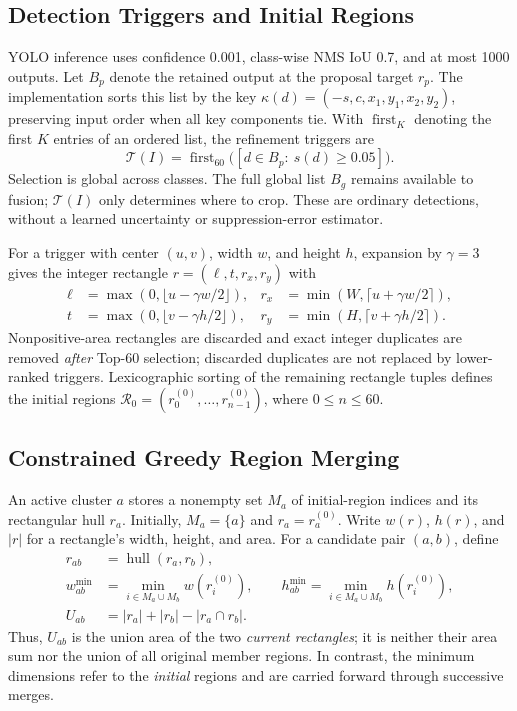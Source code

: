 \documentclass[journal]{IEEEtran}
\begin{document}
\subsection{Detection Triggers and Initial Regions}
YOLO inference uses confidence 0.001, class-wise NMS IoU 0.7, and at most 1000 outputs. Let $B_p$ denote the retained output at the proposal target $r_p$. The implementation sorts this list by the key $\kappa(d)=(-s,c,x_1,y_1,x_2,y_2)$, preserving input order when all key components tie. With $\operatorname{first}_K$ denoting the first $K$ entries of an ordered list, the refinement triggers are
\begin{equation}
\mathcal T(I)=\operatorname{first}_{60}
\bigl([d\in B_p:\ s(d)\geq0.05]\bigr).
\label{eq:triggers}
\end{equation}
Selection is global across classes. The full global list $B_g$ remains available to fusion; $\mathcal T(I)$ only determines where to crop. These are ordinary detections, without a learned uncertainty or suppression-error estimator.

For a trigger with center $(u,v)$, width $w$, and height $h$, expansion by $\gamma=3$ gives the integer rectangle $r=(\ell,t,r_x,r_y)$ with
\begin{equation}
\begin{aligned}
\ell&=\max(0,\lfloor u-\gamma w/2\rfloor),&
r_x&=\min(W,\lceil u+\gamma w/2\rceil),\\
t&=\max(0,\lfloor v-\gamma h/2\rfloor),&
r_y&=\min(H,\lceil v+\gamma h/2\rceil).
\end{aligned}
\label{eq:expansion}
\end{equation}
Nonpositive-area rectangles are discarded and exact integer duplicates are removed \emph{after} Top-60 selection; discarded duplicates are not replaced by lower-ranked triggers. Lexicographic sorting of the remaining rectangle tuples defines the initial regions $\mathcal R_0=(r_0^{(0)},\ldots,r_{n-1}^{(0)})$, where $0\leq n\leq60$.

\subsection{Constrained Greedy Region Merging}
An active cluster $a$ stores a nonempty set $M_a$ of initial-region indices and its rectangular hull $r_a$. Initially, $M_a=\{a\}$ and $r_a=r_a^{(0)}$. Write $w(r)$, $h(r)$, and $|r|$ for a rectangle's width, height, and area. For a candidate pair $(a,b)$, define
\begin{equation}
\begin{aligned}
r_{ab}&=\operatorname{hull}(r_a,r_b),\\
w_{ab}^{\min}&=\min_{i\in M_a\cup M_b}w(r_i^{(0)}),\qquad
h_{ab}^{\min}=\min_{i\in M_a\cup M_b}h(r_i^{(0)}),\\
U_{ab}&=|r_a|+|r_b|-|r_a\cap r_b|.
\end{aligned}
\label{eq:merge-state}
\end{equation}
Thus, $U_{ab}$ is the union area of the two \emph{current rectangles}; it is neither their area sum nor the union of all original member regions. In contrast, the minimum dimensions refer to the \emph{initial} regions and are carried forward through successive merges.
\end{document}
